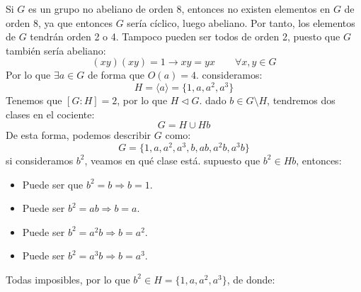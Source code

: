 \noindent
Si $G$ es un grupo no abeliano de orden 8, entonces no existen elementos en $G$ de orden 8, ya que entonces $G$ sería cíclico, luego abeliano. Por tanto, los elementos de $G$ tendrán orden 2 o 4. Tampoco pueden ser todos de orden 2, puesto que $G$ también sería abeliano:
\begin{equation*}
    (xy)(xy) = 1 \longrightarrow xy = yx \qquad \forall x,y\in G
\end{equation*}
Por lo que $\exists a\in G$ de forma que $O(a) = 4$. consideramos:
\begin{equation*}
    H = \langle a \rangle  = \{1,a,a^2,a^3\}
\end{equation*}
Tenemos que $[G:H] = 2$, por lo que $H\lhd G$. dado $b\in G\setminus H$, tendremos dos clases en el cociente:
\begin{equation*}
    G = H\cup Hb 
\end{equation*}
De esta forma, podemos describir $G$ como:
\begin{equation*}
    G = \{1,a,a^2,a^3,b, ab, a^2b, a^3b\}
\end{equation*}
si consideramos $b^2$, veamos en qué clase está. supuesto que $b^2\in Hb$, entonces:
\begin{itemize}
    \item Puede ser que $b^2 = b \Longrightarrow b = 1$.
    \item Puede ser $b^2 = ab \Longrightarrow b = a$.
    \item Puede ser $b^2 = a^2b \Longrightarrow b = a^2$.
    \item Puede ser $b^2 = a^3b \Longrightarrow b = a^3$.
\end{itemize}
Todas imposibles, por lo que $b^2 \in H = \{1,a,a^2, a^3\}$, de donde:
